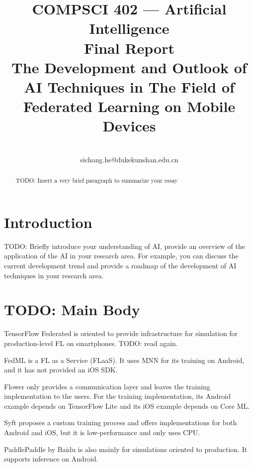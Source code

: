 \documentclass[conference]{IEEEtran}
\begin{document}
\title{
    COMPSCI 402 --- Artificial Intelligence\\
    Final Report\\
    The Development and Outlook of AI Techniques in The Field of
    Federated Learning on Mobile Devices
}

\author{
    \\
    sichang.he@dukekunshan.edu.cn
}

\maketitle

\begin{abstract}
TODO: Insert a very brief paragraph to summarize your essay
\end{abstract}

\section{Introduction}

TODO: Briefly introduce your understanding of AI,
provide an overview of the application of the AI in your research area.
For example, you can discuss the current development trend and
provide a roadmap of the development of AI techniques in your research area.

\section{TODO: Main Body}

TensorFlow Federated \cite{bonawitz2019towards} is oriented to
provide infrastructure for simulation for production-level FL on smartphones.
TODO: read again.

FedML \cite{he2020fedml} is a FL as a Service (FLaaS).
It uses MNN for its training on Android,
and it has not provided an iOS SDK.

Flower \cite{beutel2020flower,mathur2021ondevice}
only provides a communication layer and
leaves the training implementation to the users.
For the training implementation,
its Android example depends on TensorFlow Lite and
its iOS example depends on Core ML.

Syft \cite{ryffel2018generic,Ziller2021,hall2021syft}
proposes a custom training process and
offers implementations for both Android and iOS,
but it is low-performance and only uses CPU.

PaddlePaddle \cite{ma2019paddlepaddle} by Baidu is
also mainly for simulations oriented to production.
It supports inference on Android.
\end{document}
